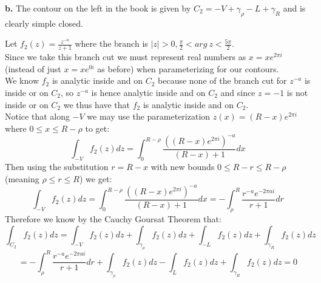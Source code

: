 \documentclass{article}
\begin{document}
{\Large\textbf{b.}} The contour on the left in the book is given by $C_2 = -V +\gamma _{\rho} - L +\gamma _R$ and is clearly simple closed.
\begin{center}
    \doublespacing
    Let $f_2 (z) =\frac{z^{-a}}{z+1}$ where the branch is $|z| > 0, \frac{\pi}{2} < arg\:z <\frac{5\pi}{2}$.
    \\Since we take this branch cut we must represent real numbers as $x = xe^{2\pi i}$ (instead of just $x = xe^{0i}$ as before) when parameterizing for our contours.
    \\We know $f_2$ is analytic inside and on $C_2$ because none of the branch cut for $z^{-a}$ is inside or on $C_2$, so $z^{-a}$ is hence analytic inside and on $C_2$ and since $z = -1$ is not inside or on $C_2$ we thus have that $f_2$ is analytic inside and on $C_2$.
    \\Notice that along $-V$ we may use the parameterization $z(x) = (R - x)e^{2\pi i}$ where $0\leq x\leq R -\rho$ to get:
    \[\int _{-V} f_2 (z) dz =\int _{0}^{R-\rho}\frac{((R-x)e^{2\pi i})^{-a}}{(R-x)+1} dx\]
    Then using the substitution $r = R - x$ with new bounds $0\leq R - r\leq R -\rho$ (meaning $\rho\leq r\leq R$) we get:
    \[\int _{-V} f_2 (z) dz =\int _{0}^{R-\rho}\frac{((R-x)e^{2\pi i})^{-a}}{(R-x)+1} dx = -\int _{\rho}^R\frac{r^{-a} e^{-2\pi ai}}{r+1}dr\]
    Therefore we know by the Cauchy Goursat Theorem that:
    \[\int _{C_2} f_2 (z) dz =\int _{-V} f_2 (z) dz +\int _{\gamma _{\rho}} f_2 (z) dz +\int _{-L} f_2 (z) dz +\int _{\gamma _R} f_2 (z) dz\]
    \[= -\int _{\rho}^R\frac{r^{-a} e^{-2\pi ai}}{r+1}dr +\int _{\gamma _{\rho}} f_2 (z) dz -\int _{L} f_2 (z) dz +\int _{\gamma _R} f_2 (z) dz = 0\]
\end{center}
\end{document}
